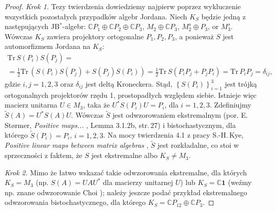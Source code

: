{\begin{proof}
\emph{Krok 1.}
Tezy twierdzenia dowiedziemy najpierw poprzez wykluczenie wszystkich
pozostałych przypadków algebr Jordana.
Niech $K_{S}$ będzie jedną z następujących JB$^{*}$-algebr:
$\mathbb{C} P_{1} \oplus \mathbb{C} P_{2} \oplus \mathbb{C} P_{3}$,
$M_{2} \oplus \mathbb{C} P_{3}$,
$M_{2}^{s} \oplus P_{3}$, or $M_{3}^{s}$.
Wówczas $K_{S}$ zawiera projektory ortogonalne $P_{1}, P_{2}, P_{3}$,
a ponieważ $S$ jest automorfizmem Jordana na $K_{S}$:
\begin{multline}
    \text{Tr} \, S(P_{i}) S(P_{j}) = \\
= \frac{1}{2} \text{Tr} \, \left( S(P_{i}) S(P_{j}) + S(P_{j}) S(P_{i}) \right)=
\frac{1}{2} \text{Tr} \, S(P_{i} P_{j} + P_{j} P_{i})=
\text{Tr} \, P_{i} P_{j} = \delta_{ij},
\end{multline}
gdzie $i,j = 1,2,3$ oraz $\delta_{ij}$ jest deltą Kroneckera.
Stąd, $\left\{S(P_{i})\right\}_{i=1}^{3}$
jest trójką ortogonalnych projektorów rzędu 1, prostopadłych względem siebie.
Istnieje więc macierz unitarna $U \in M_{3}$, taka że
$U^{*} S(P_{i}) U = P_{i}$, dla $i = 1,2,3$.
Zdefiniujmy $\tilde{S}(A) = U^{*} S(A) U$.
Wówczas $\tilde{S}$ jest odwzorowaniem ekstremalnym
(por. E.\,St{\o}rmer, \emph{Positive maps...} \cite{Stormer2013}, Lemma 3.1.2b, str.\,27)
i bistochastycznym, dla którego
$\tilde{S}(P_{i}) = P_{i}$, $i = 1,2,3$.
Na mocy twierdzenia 4.1 z pracy
S.-H.\,Kye, \emph{Positive linear maps between matrix algebras}
\cite{kye1995positive},
$\tilde{S}$ jest rozkładalne,
co stoi w sprzeczności z faktem, że $S$ jest ekstremalne albo $K_{S} \neq M_{3}$.

\emph{Krok 2.}
Mimo że łatwo wskazać takie odwzorowania ekstremalne, dla których
$K_{S}=M_{3}$ (np. $S(A) = U A U^{*}$ dla macierzy unitarnej $U$)
lub $K_{S}=\mathbb{C} \mathbf{1}$
(weźmy np. znane odwzorowanie Choi
\cite{choi1977extremal});
należy jeszcze podać przykład ekstremalnego odwzorowania bistochastycznego,
dla którego
$K_{S}= \mathbb{C} P_{12} \oplus \mathbb{C} P_{3}$.


\end{proof}}
